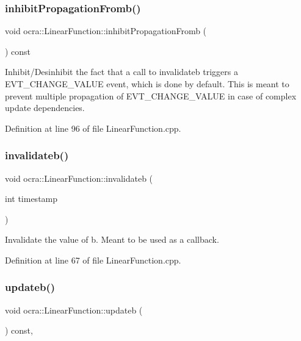 \subsubsection{\texorpdfstring{inhibit\+Propagation\+Fromb()}{inhibitPropagationFromb()}}
{\footnotesize\ttfamily void ocra\+::\+Linear\+Function\+::inhibit\+Propagation\+Fromb (\begin{DoxyParamCaption}{ }\end{DoxyParamCaption}) const\hspace{0.3cm}{\ttfamily [protected]}}

Inhibit/\+Desinhibit the fact that a call to invalidateb triggers a E\+V\+T\+\_\+\+C\+H\+A\+N\+G\+E\+\_\+\+V\+A\+L\+UE event, which is done by default. This is meant to prevent multiple propagation of E\+V\+T\+\_\+\+C\+H\+A\+N\+G\+E\+\_\+\+V\+A\+L\+UE in case of complex update dependencies. 

Definition at line 96 of file Linear\+Function.\+cpp.

\hypertarget{classocra_1_1LinearFunction_a3faf4257b2a8ebd6426a054f4242fec8}{}\label{classocra_1_1LinearFunction_a3faf4257b2a8ebd6426a054f4242fec8} 
\subsubsection{\texorpdfstring{invalidateb()}{invalidateb()}}
{\footnotesize\ttfamily void ocra\+::\+Linear\+Function\+::invalidateb (\begin{DoxyParamCaption}\item[{int}]{timestamp }\end{DoxyParamCaption})}

Invalidate the value of b. Meant to be used as a callback. 

Definition at line 67 of file Linear\+Function.\+cpp.

\hypertarget{classocra_1_1LinearFunction_a546454cd8d0909f99433ffc0e700c9e3}{}\label{classocra_1_1LinearFunction_a546454cd8d0909f99433ffc0e700c9e3} 
\subsubsection{\texorpdfstring{updateb()}{updateb()}}
{\footnotesize\ttfamily void ocra\+::\+Linear\+Function\+::updateb (\begin{DoxyParamCaption}{ }\end{DoxyParamCaption}) const\hspace{0.3cm}{\ttfamily [protected]}, {\ttfamily [virtual]}}

